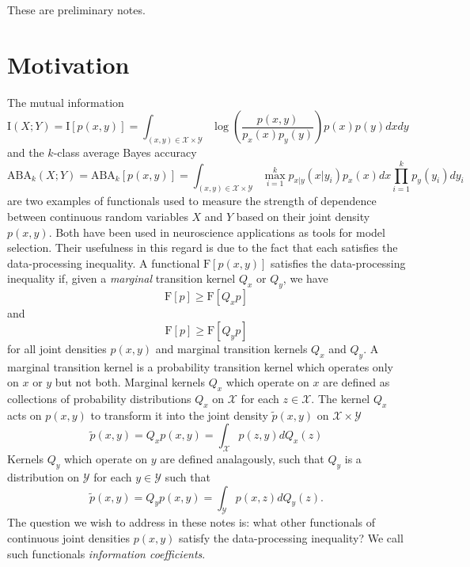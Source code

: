 \documentclass[12pt]{article}
\begin{document}
\maketitle

\newcommand{\tr}{\text{tr}}
\newcommand{\E}{\textbf{E}}
\newcommand{\diag}{\text{diag}}
\newcommand{\argmax}{\text{argmax}}
\newcommand{\Cov}{\text{Cov}}
\newcommand{\Var}{\text{Var}}
\newcommand{\argmin}{\text{argmin}}
\newcommand{\Vol}{\text{Vol}}
\newcommand{\comm}[1]{}

These are preliminary notes.

\section{Motivation}

The mutual information
\[
\text{I}(X;Y) = \text{I}[p(x,y)] = \int_{(x,y) \in \mathcal{X} \times \mathcal{Y}} \log\left(\frac{p(x, y)}{p_x(x) p_y(y)}\right) p(x) p(y) dx dy
\]
and the $k$-class average Bayes accuracy
\[
\text{ABA}_k(X; Y) = \text{ABA}_k[p(x,y)] = \int_{(x,y) \in \mathcal{X} \times \mathcal{Y}} \max_{i=1}^k p_{x|y}(x|y_i) p_x(x) dx \prod_{i=1}^k p_y(y_i) dy_i
\]
are two examples of functionals used to measure the strength of
dependence between continuous random variables $X$ and $Y$ based on
their joint density $p(x,y)$.  Both have been used in neuroscience
applications as tools for model selection.  Their usefulness in this
regard is due to the fact that each satisfies the data-processing
inequality.  A functional $\text{F}[p(x,y)]$ satisfies the
data-processing inequality if, given a \emph{marginal} transition
kernel $Q_x$ or $Q_y$, we have
\[
\text{F}[p] \geq \text{F}[Q_x p]
\]
and
\[
\text{F}[p] \geq \text{F}[Q_y p]
\]
for all joint densities $p(x,y)$ and marginal transition kernels $Q_x$
and $Q_y$.  A marginal transition kernel is a probability transition
kernel which operates only on $x$ or $y$ but not both.  Marginal
kernels $Q_x$ which operate on $x$ are defined as collections of
probability distributions $Q_x$ on $\mathcal{X}$ for each
$z \in \mathcal{X}$.  The kernel $Q_x$ acts on $p(x,y)$ to transform it
into the joint density $\tilde{p}(x,y)$ on
$\mathcal{X} \times \mathcal{Y}$
\[
\tilde{p}(x,y) = Q_x p(x,y) = \int_{\mathcal{X}}  p(z,y) dQ_x(z)
\]
Kernels $Q_y$ which operate on $y$ are defined analagously, such that $Q_y$ is a distribution on $\mathcal{Y}$ for each $y \in \mathcal{Y}$ such that
\[
\tilde{p}(x,y) = Q_y p(x, y) = \int_{\mathcal{Y}} p(x,z) dQ_y(z).
\]
The question we wish to address in these notes is: what other
functionals of continuous joint densities $p(x,y)$ satisfy the
data-processing inequality?  We call such
functionals \emph{information coefficients}.
\end{document}
